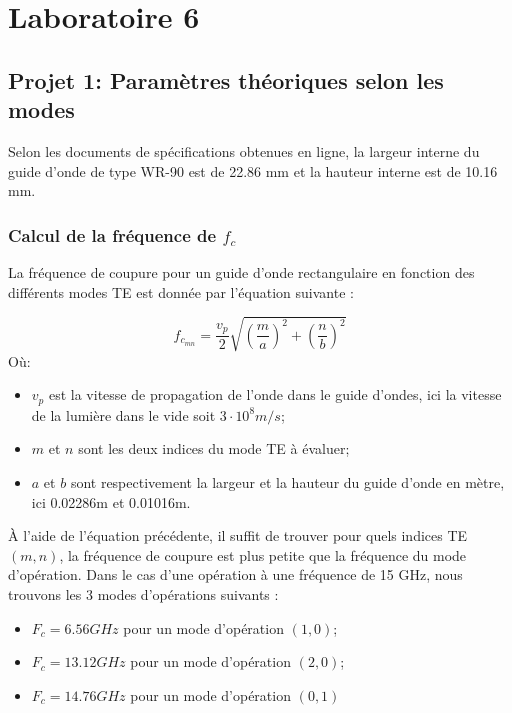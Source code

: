



\label{s:experimentation}
\chapter{Laboratoire 6}
\section{Projet 1: Paramètres théoriques selon les modes}
Selon les documents de spécifications obtenues en ligne, la largeur interne du guide d'onde de type WR-90 est de 22.86 mm et la hauteur interne est de 10.16 mm.

\subsection{Calcul de la fréquence de $f_c$}
La fréquence de coupure pour un guide d'onde rectangulaire en fonction des différents modes TE est donnée par l'équation suivante :

\begin{equation}
	f_{c_{mn}} = \frac{v_p}{2}\sqrt{\left(\frac{m}{a}\right)^2+\left(\frac{n}{b}\right)^2}
\end{equation}
Où:
\begin{itemize}
	\item $v_p$ est la vitesse de propagation de l'onde dans le guide d'ondes, ici la vitesse de la lumière dans le vide soit $3\cdot10^8m/s$;
	\item $m$ et $n$ sont les deux indices du mode TE à évaluer;
	\item $a$ et $b$ sont respectivement la largeur et la hauteur du guide d'onde en mètre, ici 0.02286m et 0.01016m.
\end{itemize}

À l'aide de l'équation précédente, il suffit de trouver pour quels indices TE $(m,n)$, la fréquence de coupure est plus petite que la fréquence du mode d'opération. Dans le cas d'une opération à une fréquence de 15 GHz, nous trouvons les 3 modes d'opérations suivants :
\begin{itemize}
	\item $F_c = 6.56 GHz$ pour un mode d'opération $(1,0)$;
	\item $F_c = 13.12 GHz$ pour un mode d'opération $(2,0)$;
	\item $F_c = 14.76 GHz$ pour un mode d'opération $(0,1)$
\end{itemize}


